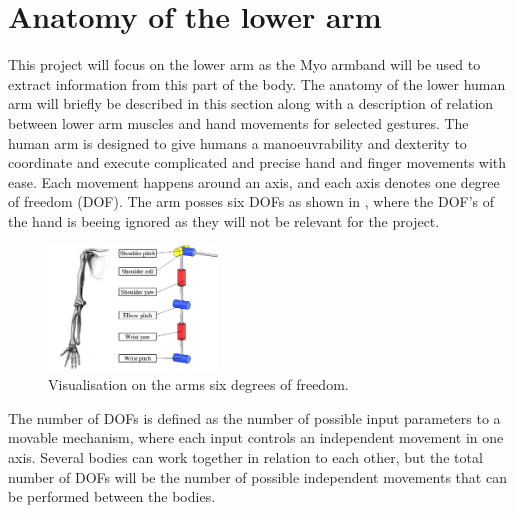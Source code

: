 \section{Anatomy of the lower arm}


This project will focus on the lower arm as the Myo armband will be used to extract information from this part of the body. The anatomy of the lower human arm will briefly be described in this section along with a description of relation between lower arm muscles and hand movements for selected gestures.
The human arm is designed to give humans a manoeuvrability and dexterity to coordinate and execute complicated and precise hand and finger movements with ease. Each movement happens around an axis, and each axis denotes one degree of freedom (DOF). The arm posses six DOFs as shown in , where the DOF's of the hand is beeing ignored as they will not be relevant for the project.

\begin{figure}[H]                                         %
	\includegraphics[width=0.4\textwidth]{figures/anatomy/human_arm_dof}  %
	\caption{Visualisation on the arms six degrees of freedom. \cite{ahmed2017}}
	\label{fig:armDOF}  %
\end{figure}

The number of DOFs is defined as the number of possible input parameters to a movable mechanism, where each input controls an independent movement in one axis. Several bodies can work together in relation to each other, but the total number of DOFs will be the number of possible independent movements that can be performed between the bodies. \cite{dicker2003}

